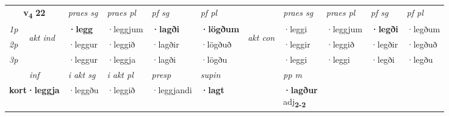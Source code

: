\noindent
\begin{tabular}{lllllllllll} \toprule
\multicolumn{2}{c}{\textbf{v{\textsubscript{4}}} \Large{\textbf{22}}}  &  \textit{praes sg}  & \textit{praes pl}  &\textit{ pf sg} & \textit{pf pl} &  &  \textit{praes sg}  & \textit{praes pl}  & \textit{pf sg} & \textit{pf pl } \\*
	\cmidrule{3-6} \cmidrule{8-11}
 {\textit{1p}} & \multirow{3}{*}{\begin{turn}{90}\textit{akt ind}\end{turn}} & \textbf{·legg} & ·leggjum & \textbf{·lagði} & \textbf{·lögðum} & \multirow{3}{*}{\begin{turn}{90}\textit{akt con}\end{turn}} &·leggi & ·leggjum & \textbf{·legði} & ·legðum\\*
 {\textit{2p}} &  &  ·leggur  & ·leggið & ·lagðir & ·lögðuð & & ·leggir & ·leggið & ·legðir & ·legðuð \\*
{\textit{3p}} &  & ·leggur & ·leggja & ·lagði & ·lögðu & & ·leggi & ·leggi& ·legði & ·legðu \\*
\cmidrule{3-6} \cmidrule{8-11}

   \multicolumn{2}{c}{\textit{inf}}  & \textit{i akt sg} & \textit{i akt pl}   & \textit{presp} & \textit{supin}  && \textit{pp m} \\*
  \multicolumn{2}{c}{\textbf{kort\allowbreak ·leggja}} & ·leggðu  & ·leggið   & ·leggjandi &  \textbf{·lagt}  && \specialcell{\textbf{·lagður} \\ adj\textbf{\textsubscript{2-2}}} \\*
\end{tabular}

